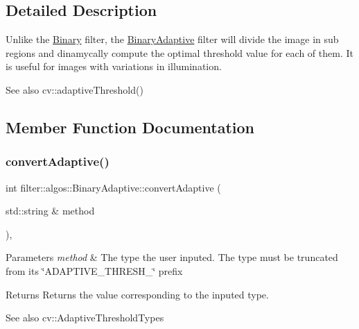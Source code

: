 \subsection{Detailed Description}
Unlike the \hyperlink{classfilter_1_1algos_1_1_binary}{Binary} filter, the \hyperlink{classfilter_1_1algos_1_1_binary_adaptive}{Binary\+Adaptive} filter will divide the image in sub regions and dinamycally compute the optimal threshold value for each of them. It is useful for images with variations in illumination. \begin{DoxySeeAlso}{See also}
cv\+::adaptive\+Threshold() 
\end{DoxySeeAlso}


\subsection{Member Function Documentation}
\mbox{\label{classfilter_1_1algos_1_1_binary_adaptive_a2cca79f85248dff026bf39d1940a60d6}} 
\subsubsection{\texorpdfstring{convert\+Adaptive()}{convertAdaptive()}}
{\footnotesize\ttfamily int filter\+::algos\+::\+Binary\+Adaptive\+::convert\+Adaptive (\begin{DoxyParamCaption}\item[{std\+::string \&}]{method }\end{DoxyParamCaption})\hspace{0.3cm}{\ttfamily [inline]}, {\ttfamily [private]}}


\begin{DoxyParams}{Parameters}
{\em method} & The type the user inputed. The type must be truncated from its \char`\"{}\+A\+D\+A\+P\+T\+I\+V\+E\+\_\+\+T\+H\+R\+E\+S\+H\+\_\+\char`\"{} prefix \\
\hline
\end{DoxyParams}
\begin{DoxyReturn}{Returns}
Returns the value corresponding to the inputed type. 
\end{DoxyReturn}
\begin{DoxySeeAlso}{See also}
cv\+::\+Adaptive\+Threshold\+Types 
\end{DoxySeeAlso}
\mbox{\label{classfilter_1_1algos_1_1_binary_adaptive_a06e3ad587fb9e958e19ded273c70e4e1}} 
